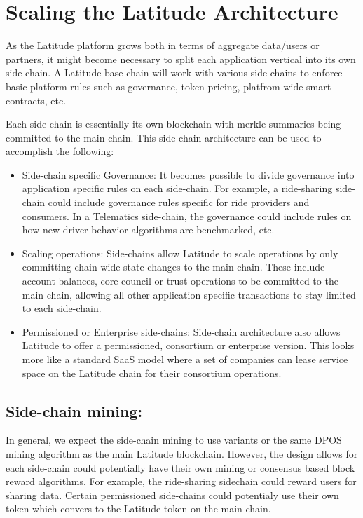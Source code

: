 \newpage
\section{Scaling the Latitude Architecture}
\label{app:latchain}

As the Latitude platform grows both in terms of aggregate data/users or partners, it might become necessary to split
each application vertical into its own side-chain. A Latitude base-chain will work with various side-chains to enforce
basic platform rules such as governance, token pricing, platfrom-wide smart contracts, etc.  

Each side-chain is essentially its own blockchain with merkle summaries being committed to the main chain. This
side-chain architecture can be used to accomplish the following:

\begin{itemize}
  \item Side-chain specific Governance: It becomes possible to divide governance into application specific rules on
        each side-chain. For example, a ride-sharing side-chain could include governance rules specific for ride
        providers and consumers. In a Telematics side-chain, the governance could include rules on how new driver
        behavior algorithms are benchmarked, etc.
  \item Scaling operations: Side-chains allow Latitude to scale operations by only committing chain-wide state changes
      to the main-chain. These include account balances, core council or trust operations to be committed to the main
        chain, allowing all other application specific transactions to stay limited to each side-chain.
  \item Permissioned or Enterprise side-chains: Side-chain architecture also allows Latitude to offer a permissioned,
      consortium or enterprise version. This looks more like a standard SaaS model where a set of companies can lease
        service space on the Latitude chain for their consortium operations.
\end{itemize}

\subsection{Side-chain mining:}

In general, we expect the side-chain mining to use variants or the same DPOS mining algorithm as the main Latitude
blockchain.  However, the design allows for each side-chain could potentially have their own mining or consensus based
block reward algorithms. For example, the ride-sharing sidechain could reward users for sharing data. Certain
permissioned side-chains could potentialy use their own token which convers to the Latitude token on the main chain.


